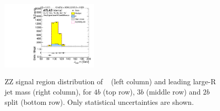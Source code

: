 \begin{figure}[htb!]
\begin{center}
\includegraphics[width=0.41\textwidth,angle=-90]{figures/boosted/ZZ/Moriond_ZZ_TwoTag_split_Signal_leadHCand_Mass_s.pdf}\\
\end{center}
\caption{ZZ signal region distribution of \mtwoJ~ (left column) and leading large-R jet mass (right column), for $4b$ (top row), $3b$ (middle row) and $2b$ split (bottom row). Only statistical uncertainties are shown.}
\label{CRSB:ZZSR_Distribution}
\end{figure}

% 

% 

% 


